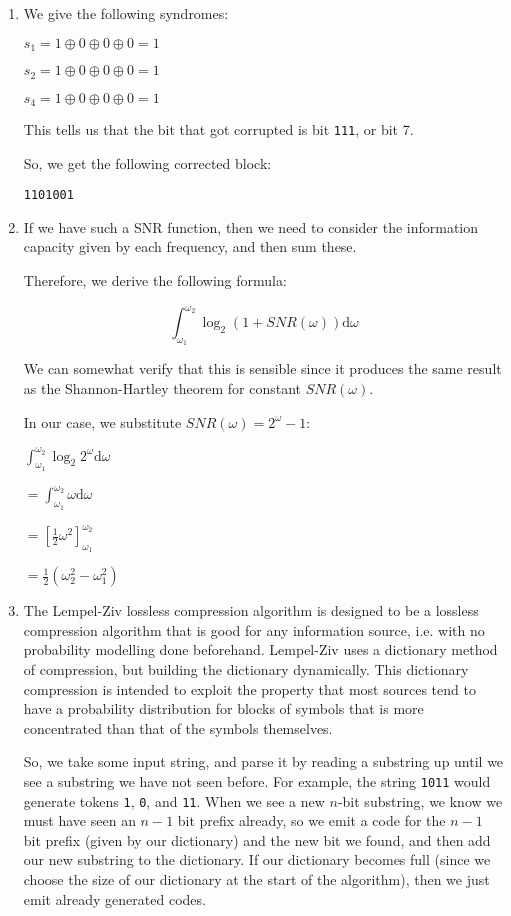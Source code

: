 


\begin{enumerate}[label=(\alph*)]
  \item

    We give the following syndromes:

    $s_1 = 1 \oplus 0 \oplus 0 \oplus 0 = 1$

    $s_2 = 1 \oplus 0 \oplus 0 \oplus 0 = 1$

    $s_4 = 1 \oplus 0 \oplus 0 \oplus 0 = 1$

    This tells us that the bit that got corrupted is bit \texttt{111}, or bit 7.

    So, we get the following corrected block:

    \texttt{1101001}

  \item
    If we have such a SNR function, then we need to consider the information capacity given by each frequency, and then sum these.

    Therefore, we derive the following formula:

    \[
      \int_{\omega_1}^{\omega_2} \log_2(1 + SNR(\omega)) \mathrm{d}\omega
    \] 

    We can somewhat verify that this is sensible since it produces the same result as the Shannon-Hartley theorem for constant $SNR(\omega)$.

    In our case, we substitute $SNR(\omega) = 2^{\omega} - 1$:

    $\int_{\omega_1}^{\omega_2} \log_2 2^\omega \mathrm{d}\omega$

    $= \int_{\omega_1}^{\omega_2} \omega \mathrm{d}\omega$

    $= \left[ \frac{1}{2}\omega^2 \right]^{\omega_2}_{\omega_1}$

    $= \frac{1}{2}(\omega_2^2 - \omega_1^2)$

  \item

    The Lempel-Ziv lossless compression algorithm is designed to be a lossless compression algorithm that is good for any information source, i.e. with no probability modelling done beforehand. Lempel-Ziv uses a dictionary method of compression, but building the dictionary dynamically. This dictionary compression is intended to exploit the property that most sources tend to have a probability distribution for blocks of symbols that is more concentrated than that of the symbols themselves.

    So, we take some input string, and parse it by reading a substring up until we see a substring we have not seen before. For example, the string \texttt{1011} would generate tokens \texttt{1}, \texttt{0}, and \texttt{11}. When we see a new $n$-bit substring, we know we must have seen an $n-1$ bit prefix already, so we emit a code for the $n-1$ bit prefix (given by our dictionary) and the new bit we found, and then add our new substring to the dictionary. If our dictionary becomes full (since we choose the size of our dictionary at the start of the algorithm), then we just emit already generated codes.


\end{enumerate}
